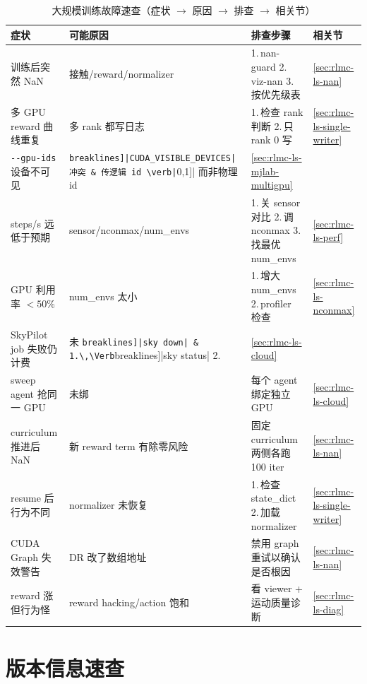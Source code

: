 \begin{table}[H]\centering\small
\caption{大规模训练故障速查（症状 $\to$ 原因 $\to$ 排查 $\to$ 相关节）}
\label{tab:rlmc-ls-troubleshoot}
\begin{tabular}{@{}p{3.4cm}p{2.8cm}p{3.6cm}p{2.0cm}@{}}
\toprule
症状 & 可能原因 & 排查步骤 & 相关节 \\
\midrule
训练后突然 NaN & 接触/reward/normalizer & 1.\,nan-guard 2.\,viz-nan 3.\,按优先级表 & \cref{sec:rlmc-ls-nan} \\
多 GPU reward 曲线重复 & 多 rank 都写日志 & 1.\,检查 rank 判断 2.\,只 rank 0 写 & \cref{sec:rlmc-ls-single-writer} \\
\verb|--gpu-ids| 设备不可见 & \Verb[breaklines]|CUDA_VISIBLE_DEVICES| 冲突 & 传逻辑 id \verb|[0,1]| 而非物理 id & \cref{sec:rlmc-ls-mjlab-multigpu} \\
steps/s 远低于预期 & sensor/nconmax/num\_envs & 1.\,关 sensor 对比 2.\,调 nconmax 3.\,找最优 num\_envs & \cref{sec:rlmc-ls-perf} \\
GPU 利用率 $<50\%$ & num\_envs 太小 & 1.\,增大 num\_envs 2.\,profiler 检查 & \cref{sec:rlmc-ls-nconmax} \\
SkyPilot job 失败仍计费 & 未 \Verb[breaklines]|sky down| & 1.\,\Verb[breaklines]|sky status| 2.\,\Verb[breaklines]|sky down| & \cref{sec:rlmc-ls-cloud} \\
sweep agent 抢同一 GPU & 未绑 \Verb[breaklines]|CUDA_VISIBLE_DEVICES| & 每个 agent 绑定独立 GPU & \cref{sec:rlmc-ls-cloud} \\
curriculum 推进后 NaN & 新 reward term 有除零风险 & 固定 curriculum 两侧各跑 100 iter & \cref{sec:rlmc-ls-nan} \\
resume 后行为不同 & normalizer 未恢复 & 1.\,检查 state\_dict 2.\,加载 normalizer & \cref{sec:rlmc-ls-single-writer} \\
CUDA Graph 失效警告 & DR 改了数组地址 & 禁用 graph 重试以确认是否根因 & \cref{sec:rlmc-ls-nan} \\
reward 涨但行为怪 & reward hacking/action 饱和 & 看 viewer + 运动质量诊断 & \cref{sec:rlmc-ls-diag} \\
\bottomrule
\end{tabular}
\end{table}

\section{版本信息速查}
\label{sec:rlmc-ls-versions}

